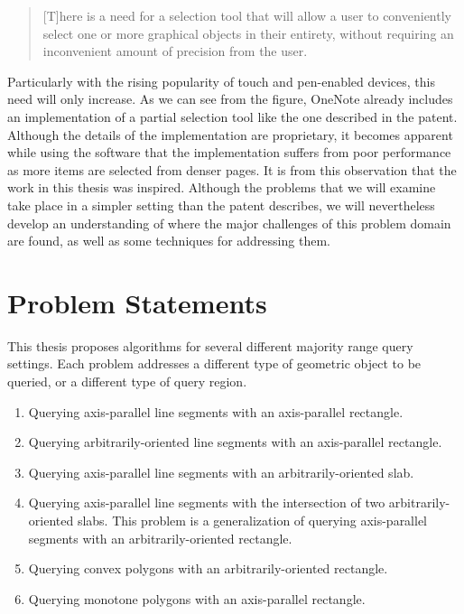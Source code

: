 \begin{quote}
[T]here is a need for a selection tool that will allow a user to conveniently select one or more graphical objects in their entirety, without requiring an inconvenient amount of precision from the user.
\end{quote}

\noindent Particularly with the rising popularity of touch and pen-enabled devices, this need will only increase.  
As we can see from the figure, OneNote already includes an implementation of a partial selection tool like the one described in the patent. 
Although the details of the implementation are proprietary, it becomes apparent while using the software that the implementation suffers from poor performance as more items are selected from denser pages.
It is from this observation that the work in this thesis was inspired.  
Although the problems that we will examine take place in a simpler setting than the patent describes, we will nevertheless develop an understanding of where the major challenges of this problem domain are found, as well as some techniques for addressing them.


\section{Problem Statements}
\label{:intro:problems}

This thesis proposes algorithms for several different majority range query settings.  Each problem addresses a different type of geometric object to be queried, or a different type of query region.

\begin{enumerate}
\item Querying axis-parallel line segments with an axis-parallel rectangle.

\item Querying arbitrarily-oriented line segments with an axis-parallel rectangle.

\item Querying axis-parallel line segments with an arbitrarily-oriented slab.

\item Querying axis-parallel line segments with the intersection of two arbitrarily-oriented slabs. This problem is a generalization of querying axis-parallel segments with an arbitrarily-oriented rectangle.

\item Querying convex polygons with an arbitrarily-oriented rectangle.

\item Querying monotone polygons with an axis-parallel rectangle.
\end{enumerate}


